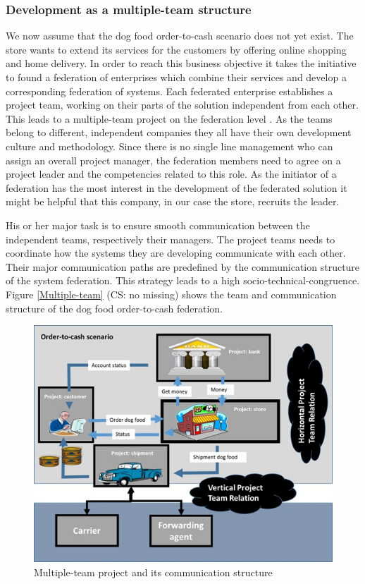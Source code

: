 \subsubsection{Development as a multiple-team structure}
We now assume that the dog food order-to-cash scenario does not yet exist. The store wants to extend its services for the customers by offering online shopping and home delivery. In order to reach this business objective it takes the initiative to found a federation of enterprises which combine their services and develop a corresponding federation of systems.
Each federated enterprise establishes a project team, working on their parts of the solution independent from each other. This leads to a multiple-team project on the federation level \cite{book:OrgPatternsAgile}. As the teams belong to different, independent companies they all have their own development culture and methodology.
Since there is no single line management who can assign an overall project manager, the federation members need to agree on a project leader and the competencies related to this role. As the initiator of a federation has the most interest in the development of the federated solution it might be helpful that this company, in our case the store, recruits the leader.

His or her major task is to ensure smooth communication between the independent teams, respectively their managers. The project teams needs to coordinate how the systems they are developing communicate with each other. Their major communication paths are predefined by the communication structure of the system federation. This strategy leads to a high socio-technical-congruence. Figure \ref{Multiple-team} (CS: no missing) shows the team and communication structure of the dog food order-to-cash federation.

\begin{figure}[htbp]
	\centering
	\includegraphics[width=0.6\linewidth] {Figures/Chapter5/Project/MultipleTeam.jpg}
	\caption[Multiple-team project and its communication structure]{Multiple-team project and its communication structure}
	\label{fig:Multiple-team}
\end{figure}

